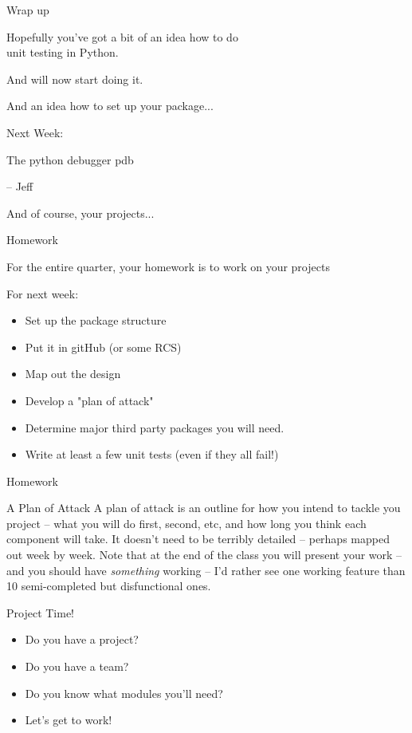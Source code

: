 \documentclass{beamer}
\begin{document}
\begin{frame}[fragile]{Wrap up}

\vfill
{\Large Hopefully you've got a bit of an idea how to do\\[0.1in]
        unit testing in Python.}

\vfill
{\Large And will now start doing it.}

\vfill
{\Large And an idea how to set up your package...}

\end{frame}

\begin{frame}[fragile]{Next Week:}

\vfill
{\LARGE The python debugger pdb}

\vfill
{\Large  -- Jeff}

\vfill
{\Large And of course, your projects...}

\vfill

\end{frame}

\begin{frame}[fragile]{Homework}

For the entire quarter, your homework is to work on your projects

For next week:

\begin{itemize}
    \item Set up the package structure
    \item Put it in gitHub (or some RCS)
    \item Map out the design
    \item Develop a "plan of attack"
    \item Determine major third party packages you will need.
    \item Write at least a few unit tests (even if they all fail!)
\end{itemize}

\end{frame}

\begin{frame}[fragile]{Homework}

{\Large A Plan of Attack}
\vfill
A plan of attack is an outline for how you intend to tackle you project -- what you will do first, second, etc, and how long you think each component will take.
\vfill
It doesn't need to be terribly detailed -- perhaps mapped out week by week.
\vfill
Note that at the end of the class you will present your work -- and you should have \emph{something} working -- I'd rather see one working feature than 10 semi-completed but disfunctional ones.

\end{frame}


\begin{frame}[fragile]{Project Time!}

\begin{itemize}
    \item Do you have a project? 
    \item Do you have a team?
    \item Do you know what modules you'll need?
    \item Let's get to work!
\end{itemize}

\end{frame}
\end{document}
